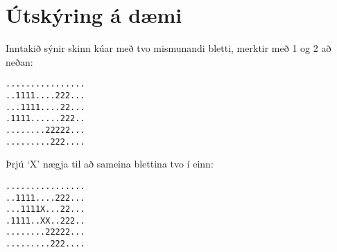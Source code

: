 \section*{Útskýring á dæmi}
Inntakið sýnir skinn kúar með tvo mismunandi bletti, merktir með 1 og 2 að
neðan:

\begin{verbatim}
................
..1111....222...
...1111....22...
.1111......222..
........22222...
.........222....
\end{verbatim}

Þrjú `X' nægja til að sameina blettina tvo í einn:

\begin{verbatim}
................
..1111....222...
...1111X...22...
.1111..XX..222..
........22222...
.........222....
\end{verbatim}

